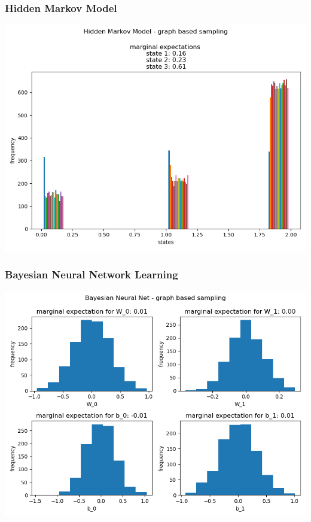 \documentclass[10pt]{homeworg}
\begin{document}
\subsubsection{Hidden Markov Model}
\begin{center}
\includegraphics[scale=0.5]{figures/graph_3}
\end{center}

\subsubsection{Bayesian Neural Network Learning}
\begin{center}
\includegraphics[scale=0.8]{figures/graph_4}
\end{center}
\end{document}
